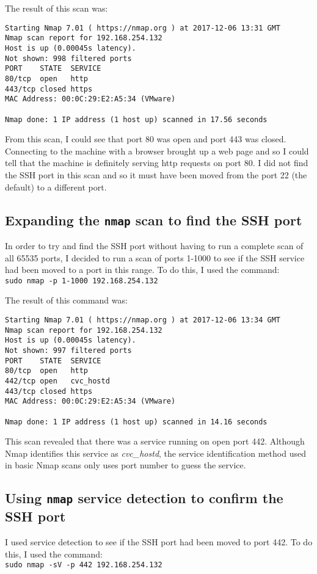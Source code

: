 \documentclass[12pt]{report}
\newcommand{\term}[1]{\colorbox{light-gray}{\texttt{#1}}}
\begin{document}
The result of this scan was:
\begin{Verbatim}[frame=leftline]
Starting Nmap 7.01 ( https://nmap.org ) at 2017-12-06 13:31 GMT
Nmap scan report for 192.168.254.132
Host is up (0.00045s latency).
Not shown: 998 filtered ports
PORT    STATE  SERVICE
80/tcp  open   http
443/tcp closed https
MAC Address: 00:0C:29:E2:A5:34 (VMware)

Nmap done: 1 IP address (1 host up) scanned in 17.56 seconds
\end{Verbatim}

From this scan, I could see that port 80 was open and port 443 was closed. Connecting to the machine with a browser brought up a web page and so I could tell that the machine is definitely serving http requests on port 80. I did not find the SSH port in this scan and so it must have been moved from the port 22 (the default) to a different port.

\subsection{Expanding the \texttt{nmap} scan to find the SSH port}
In order to try and find the SSH port without having to run a complete scan of all 65535 ports, I decided to run a scan of ports 1-1000 to see if the SSH service had been moved to a port in this range. To do this, I used the command:\\
\term{sudo nmap -p 1-1000 192.168.254.132}

The result of this command was:
\begin{Verbatim}[frame=leftline]
Starting Nmap 7.01 ( https://nmap.org ) at 2017-12-06 13:34 GMT
Nmap scan report for 192.168.254.132
Host is up (0.00045s latency).
Not shown: 997 filtered ports
PORT    STATE  SERVICE
80/tcp  open   http
442/tcp open   cvc_hostd
443/tcp closed https
MAC Address: 00:0C:29:E2:A5:34 (VMware)

Nmap done: 1 IP address (1 host up) scanned in 14.16 seconds
\end{Verbatim}

This scan revealed that there was a service running on open port 442. Although Nmap identifies this service as \textit{cvc\_hostd}, the service identification method used in basic Nmap scans only uses port number to guess the service.

\subsection{Using \texttt{nmap} service detection to confirm the SSH port}
I used service detection to see if the SSH port had been moved to port 442. To do this, I used the command:\\
\term{sudo nmap -sV -p 442 192.168.254.132}
\end{document}
